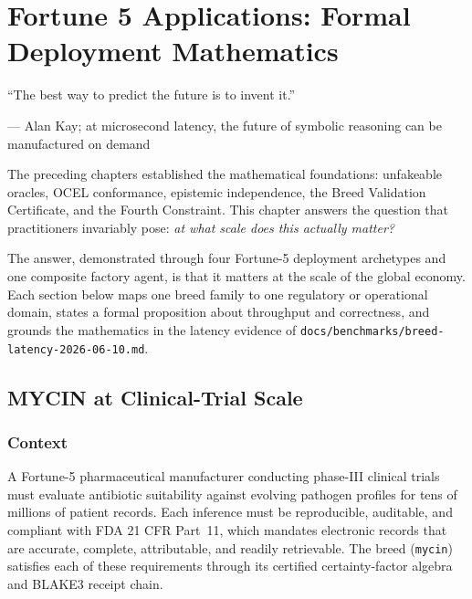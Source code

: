 
\chapter{Fortune 5 Applications: Formal Deployment Mathematics}
\label{chap:fortune5}

\epigraph{%
  ``The best way to predict the future is to invent it.''
}{--- Alan Kay; at microsecond latency, the future of symbolic reasoning can be manufactured on demand}

\noindent The preceding chapters established the mathematical foundations: unfakeable oracles,
OCEL conformance, epistemic independence, the Breed Validation Certificate, and the Fourth
Constraint. This chapter answers the question that practitioners invariably pose:
\emph{at what scale does this actually matter?}

The answer, demonstrated through four Fortune-5 deployment archetypes and one composite
factory agent, is that it matters at the scale of the global economy. Each section below
maps one breed family to one regulatory or operational domain, states a formal proposition
about throughput and correctness, and grounds the mathematics in the latency evidence of
\texttt{docs/benchmarks/breed-latency-2026-06-10.md}.

\section{MYCIN at Clinical-Trial Scale}
\label{sec:mycin-clinical}

\subsection{Context}
\label{subsec:mycin-context}

A Fortune-5 pharmaceutical manufacturer conducting phase-III clinical trials must evaluate
antibiotic suitability against evolving pathogen profiles for tens of millions of patient
records. Each inference must be reproducible, auditable, and compliant with FDA 21 CFR
Part~11, which mandates electronic records that are accurate, complete, attributable, and
readily retrievable. The \MYCIN{} breed (\texttt{mycin}) satisfies each of these
requirements through its certified certainty-factor algebra and BLAKE3 receipt chain.

